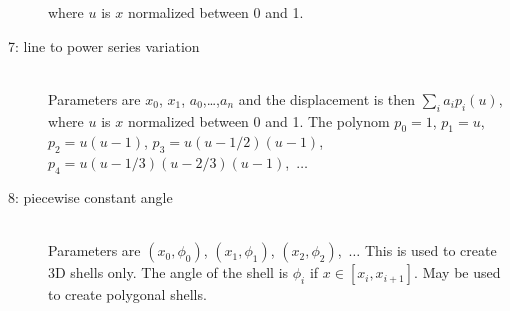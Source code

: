\begin{description}
where $u$ is $x$ normalized between 0 and 1. 
\item[7: line to power series variation] \mbox{} \\	
Parameters are $x_0$, $x_1$, $a_0$,\ldots,$a_n$
and the displacement is then $\sum_i a_i p_i(u)$,
where $u$ is $x$ normalized between 0 and 1.
The polynom $p_0=1$, $p_1=u$, $p_2=u(u-1)$, 
$p_3=u(u-1/2)(u-1)$, $p_4=u(u-1/3)(u-2/3)(u-1)$,~$\ldots$
\item[8: piecewise constant angle] \mbox{} \\
Parameters are $(x_0,\phi_0)$, $(x_1,\phi_1)$, $(x_2,\phi_2)$,~$\ldots$
This is used to create 3D shells only. 
The angle of the shell is $\phi_i$ if $x \in [x_i,x_{i+1}]$. 
May be used to create polygonal shells.

\end{description}

